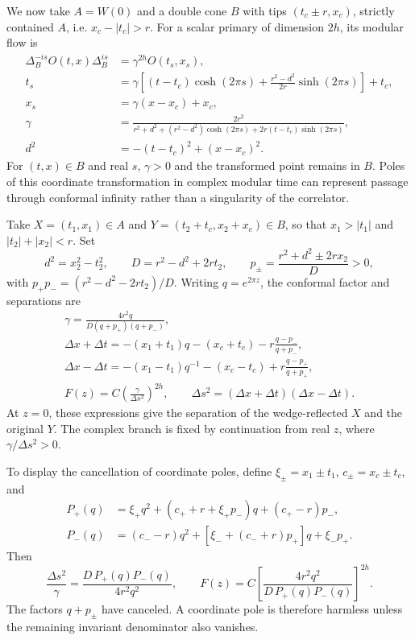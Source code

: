 \documentclass[a4paper,11pt]{article}
\theoremstyle{definition}
\begin{document}
We now take $A=W(0)$ and a double cone $B$ with tips $(t_c\pm r,x_c)$, strictly contained $A$, i.e. $x_c-|t_c|>r$.
For a scalar primary of dimension $2h$, its modular flow is
\begin{align}
 \Delta_B^{-is}O(t,x)\Delta_B^{is}&=\gamma^{2h}O(t_s,x_s),
 \label{eq:ball-modular-flow}\\
 t_s&=\gamma\left[(t-t_c)\cosh(2\pi s)+\frac{r^2-d^2}{2r}\sinh(2\pi s)\right]+t_c,
 \label{eq:ball-time}\\
 x_s&=\gamma(x-x_c)+x_c,
 \label{eq:ball-space}\\
 \gamma&=\frac{2r^2}{r^2+d^2+(r^2-d^2)\cosh(2\pi s)+2r(t-t_c)\sinh(2\pi s)},
 \label{eq:ball-conformal-factor}\\
 d^2&=-(t-t_c)^2+(x-x_c)^2.
 \label{eq:ball-distance}
\end{align}
For $(t,x)\in B$ and real $s$, $\gamma>0$ and the transformed point remains in $B$. Poles of this coordinate transformation in complex modular time can represent passage through conformal infinity rather than a singularity of the correlator.

Take $X=(t_1,x_1)\in A$ and $Y=(t_2+t_c,x_2+x_c)\in B$, so that $x_1>|t_1|$ and $|t_2|+|x_2|<r$. Set
\begin{equation}
 d^2=x_2^2-t_2^2,\qquad D=r^2-d^2+2rt_2,\qquad
 p_\pm=\frac{r^2+d^2\pm2rx_2}{D}>0,
 \label{eq:ball-parameters}
\end{equation}
with $p_+p_-=(r^2-d^2-2rt_2)/D$. Writing $q=e^{2\pi z}$, the conformal factor and separations are
\begin{gather}
 \gamma=\frac{4r^2q}{D(q+p_+)(q+p_-)},
 \label{eq:ball-gamma-factorized}\\
 \Delta x+\Delta t=-(x_1+t_1)q-(x_c+t_c)-r\frac{q-p_-}{q+p_-},
 \label{eq:ball-separation-plus}\\
 \Delta x-\Delta t=-(x_1-t_1)q^{-1}-(x_c-t_c)+r\frac{q-p_+}{q+p_+},
 \label{eq:ball-separation-minus}\\
 F(z)=C\left(\frac{\gamma}{\Delta s^2}\right)^{2h},\qquad \Delta s^2=(\Delta x+\Delta t)(\Delta x-\Delta t).
 \label{eq:ball-matrix-element}
\end{gather}
At $z=0$, these expressions give the separation of the wedge-reflected $X$ and the original $Y$. The complex branch is fixed by continuation from real $z$, where $\gamma/\Delta s^2>0$.

To display the cancellation of coordinate poles, define $\xi_\pm=x_1\pm t_1$, $c_\pm=x_c\pm t_c$, and
\begin{align}
 P_+(q)&=\xi_+q^2+(c_++r+\xi_+p_-)q+(c_+-r)p_-,
 \label{eq:ball-polynomial-plus}\\
 P_-(q)&=(c_--r)q^2+[\xi_-+(c_-+r)p_+]q+\xi_-p_+.
 \label{eq:ball-polynomial-minus}
\end{align}
Then
\begin{equation}
 \frac{\Delta s^2}{\gamma}=\frac{D\,P_+(q)P_-(q)}{4r^2q^2},\qquad
 F(z)=C\left[\frac{4r^2q^2}{D\,P_+(q)P_-(q)}\right]^{2h}.
 \label{eq:ball-invariant-denominator}
\end{equation}
The factors $q+p_\pm$ have canceled. A coordinate pole is therefore harmless unless the remaining invariant denominator also vanishes.
\end{document}

